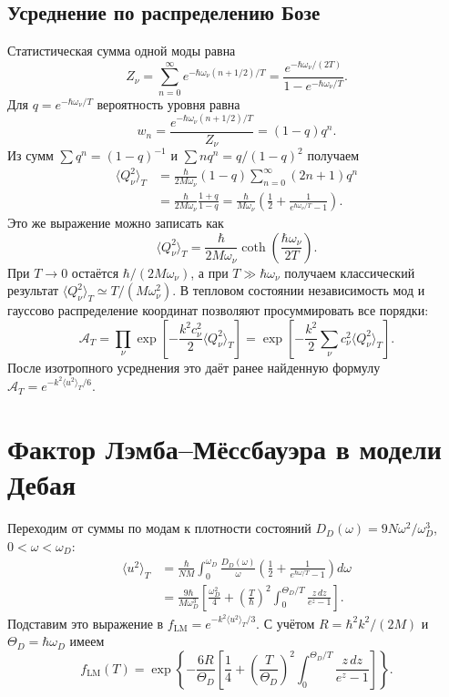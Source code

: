 \documentclass[../final.tex]{subfiles}
\begin{document}
\subsection{Усреднение по распределению Бозе}
Статистическая сумма одной моды равна
\begin{equation*}
 Z_\nu=\sum_{n=0}^\infty e^{-\hbar\omega_\nu(n+1/2)/T}
 =\frac{e^{-\hbar\omega_\nu/(2T)}}{1-e^{-\hbar\omega_\nu/T}}.
\end{equation*}
Для $q=e^{-\hbar\omega_\nu/T}$ вероятность уровня равна
\begin{equation*}
 w_n=\frac{e^{-\hbar\omega_\nu(n+1/2)/T}}{Z_\nu}
 =(1-q)q^n.
\end{equation*}
Из сумм $\sum q^n=(1-q)^{-1}$ и $\sum nq^n=q/(1-q)^2$ получаем
\begin{align*}
 \langle Q_\nu^2\rangle_T
 &=\frac\hbar{2M\omega_\nu}(1-q)\sum_{n=0}^\infty(2n+1)q^n\\
 &=\frac\hbar{2M\omega_\nu}\frac{1+q}{1-q}
 =\frac\hbar{M\omega_\nu}
 \left(\frac12+\frac1{e^{\hbar\omega_\nu/T}-1}\right).
\end{align*}
Это же выражение можно записать как
\begin{equation*}
 \langle Q_\nu^2\rangle_T=\frac\hbar{2M\omega_\nu}
 \coth\!\left(\frac{\hbar\omega_\nu}{2T}\right).
\end{equation*}
При $T\to0$ остаётся $\hbar/(2M\omega_\nu)$, а при
$T\gg\hbar\omega_\nu$ получаем классический результат
$\langle Q_\nu^2\rangle_T\simeq T/(M\omega_\nu^2)$.
В тепловом состоянии независимость мод и гауссово распределение координат
позволяют просуммировать все порядки:
\begin{equation*}
 \mathcal A_T=\prod_\nu
 \exp\!\left[-\frac{k^2c_\nu^2}{2}\langle Q_\nu^2\rangle_T\right]
 =\exp\!\left[-\frac{k^2}{2}\sum_\nu c_\nu^2
 \langle Q_\nu^2\rangle_T\right].
\end{equation*}
После изотропного усреднения это даёт ранее найденную формулу
$\mathcal A_T=e^{-k^2\langle u^2\rangle_T/6}$.

\clearpage
\section{Фактор Лэмба--Мёссбауэра в модели Дебая}
Переходим от суммы по модам к плотности состояний
$D_D(\omega)=9N\omega^2/\omega_D^3$, $0<\omega<\omega_D$:
\begin{align*}
 \langle u^2\rangle_T
 &=\frac\hbar{NM}\int_0^{\omega_D}\frac{D_D(\omega)}\omega
 \left(\frac12+\frac1{e^{\hbar\omega/T}-1}\right)d\omega\\
 &=\frac{9\hbar}{M\omega_D^3}
 \left[\frac{\omega_D^2}{4}
 +\left(\frac T\hbar\right)^2
 \int_0^{\Theta_D/T}\frac{z\,dz}{e^z-1}\right].
\end{align*}
Подставим это выражение в $f_{\mathrm{LM}}=e^{-k^2\langle u^2\rangle_T/3}$.
С учётом $R=\hbar^2k^2/(2M)$ и $\Theta_D=\hbar\omega_D$ имеем
\begin{equation*}
 \boxed{f_{\mathrm{LM}}(T)=\exp\!\left\{
 -\frac{6R}{\Theta_D}\left[\frac14+
 \left(\frac{T}{\Theta_D}\right)^2
 \int_0^{\Theta_D/T}\frac{z\,dz}{e^z-1}\right]\right\}.}
\end{equation*}
\end{document}
